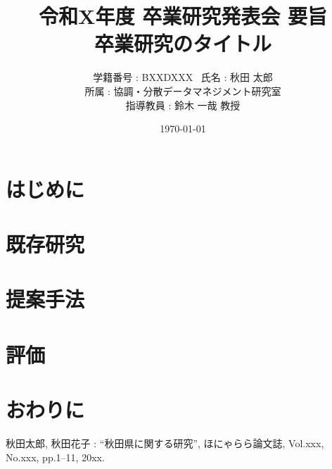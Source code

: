 \documentclass[11pt,a4j,twocolumn]{jsarticle}
\title{
    {\vspace{-2cm}}{\normalsize 令和X年度 卒業研究発表会 要旨}
    {\bf \\ 卒業研究のタイトル }
}
\author{
    学籍番号 : BXXDXXX \ 氏名 : 秋田 太郎 \\
    所属 : 協調・分散データマネジメント研究室 \\
    指導教員 : 鈴木 一哉 教授
}
\date{\today}
\begin{document}
\maketitle

\section{はじめに}

\section{既存研究}

\section{提案手法}

\section{評価}

\section{おわりに}

\begin{thebibliography}{9}
    秋田太郎, 秋田花子 : ``秋田県に関する研究'', ほにゃらら論文誌, Vol.xxx, No.xxx, pp.1--11, 20xx.
\end{thebibliography}
\end{document}
